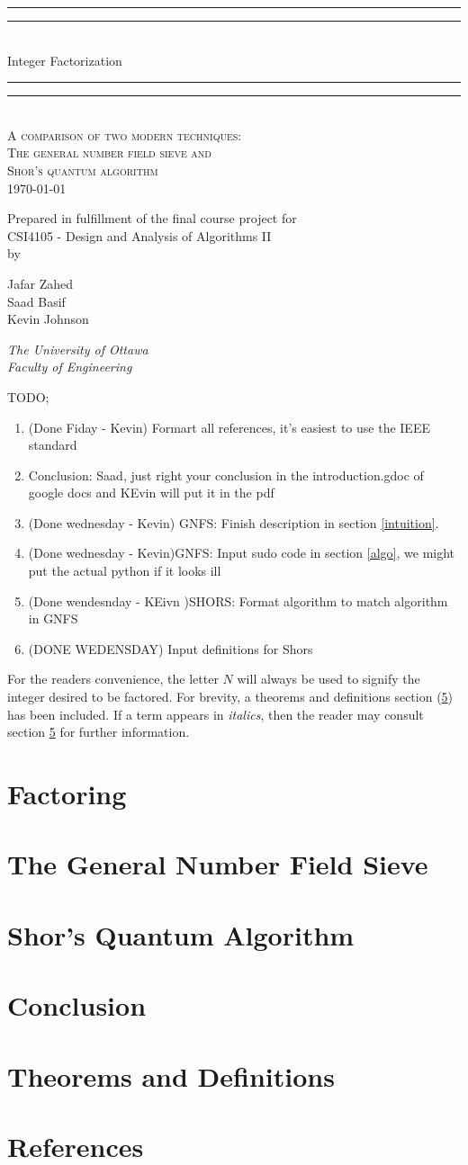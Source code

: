 \documentclass[10pt,a4paper]{article}
\theoremstyle{definition}
\newcommand*{\titleGP}{
  \begingroup %
  \centering %
  \vspace*{\baselineskip} %

  \rule{\textwidth}{1.6pt}\vspace*{-\baselineskip}\vspace*{2pt} %
  \rule{\textwidth}{0.4pt}\\[\baselineskip] %

  {\huge Integer Factorization}\\[0.2\baselineskip] %

  \rule{\textwidth}{0.4pt}\vspace*{-\baselineskip}\vspace{3.2pt} %
  \rule{\textwidth}{1.6pt}\\[\baselineskip] %

  \scshape %
  A comparison of two modern techniques: \\ %
  The general number field sieve and \\
  Shor's quantum algorithm  \\[\baselineskip] %

  \today \par %

  \vspace*{2\baselineskip} %

  Prepared in fulfillment of the final course project for \\
  CSI4105 - Design and Analysis of Algorithms II \\
  by \\[\baselineskip]
  {\Large Jafar Zahed \\ Saad Basif \\ Kevin Johnson \par} %

  \vspace*{2\baselineskip} 

  {\itshape The University of Ottawa \\ Faculty of Engineering \par} %

  \vfill %
  \endgroup
}
\newcommand{\TODO}{
  {\color{red} TODO;
  \begin{enumerate}
    \item (Done Fiday - Kevin) Formart all references, it's easiest to use the IEEE standard
    \item Conclusion: Saad, just right your conclusion in the introduction.gdoc of google docs and KEvin will put it in the pdf 
    \item (Done wednesday - Kevin) GNFS: Finish description in section \ref{intuition}. 
    \item (Done wednesday - Kevin)GNFS: Input sudo code in section \ref{algo}, we might put the actual python if it looks ill 
    \item (Done wendesnday - KEivn )SHORS: Format algorithm to match algorithm in GNFS 
    \item (DONE WEDENSDAY) Input definitions for Shors 
  \end{enumerate}
}}
\begin{document}
  \titleGP

  \TODO

  \newpage
  \tableofcontents
  \newpage



  For the readers convenience, the letter $N$ will always be used to signify the integer desired to be factored. For brevity, a theorems and definitions section (\ref{theoremdef}) has been included. If a term appears in \textit{italics}, then the reader may consult section \ref{theoremdef} for further information.  

  \section{Factoring}
    
    \newpage
  \section{The General Number Field Sieve}
    
    \newpage
  \section{Shor's Quantum Algorithm}
     
  \section{Conclusion}
    
  \section{Theorems and Definitions} \label{theoremdef}
    
  \section{References}
    
\end{document}
